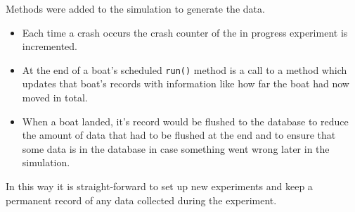   Methods were added to the simulation to generate the data.
  \begin{itemize}
    \item Each time a crash occurs the crash counter of the in progress experiment is incremented.
    \item At the end of a boat's scheduled \texttt{run()} method is a call to a method which updates that boat's records with information like how far the boat had now moved in total.
    \item When a boat landed, it's record would be flushed to the database to reduce the amount of data that had to be flushed at the end and to ensure that some data is in the database in case something went wrong later in the simulation.
  \end{itemize}
  
  In this way it is straight-forward to set up new experiments and keep a permanent record of any data collected during the experiment.

